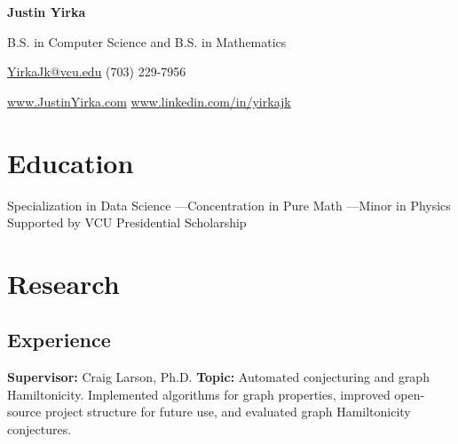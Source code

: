 \documentclass[11pt,letterpaper,serif]{moderncv}
\begin{document}

\thispagestyle{firstpage}

\begin{center}
	{\huge\textbf{Justin Yirka}}
	
	B.S. in Computer Science and B.S. in Mathematics
	
	\href{mailto:yirkajk@vcu.edu}{YirkaJk@vcu.edu} \hspace{2em} (703) 229-7956
	
	\url{www.JustinYirka.com} \qquad \url{www.linkedin.com/in/yirkajk}	
\end{center}


\setlength{\parskip}{0em}
\setlength\bibitemsep{\parskip}


\vspace{-2em}
\section{Education}
\vspace{-1.5em}
{	
	\begin{adjustwidth}{.25in}{}
		Specialization in Data Science \quad---\quad Concentration in Pure Math \quad---\quad Minor in Physics \newline
		Supported by VCU Presidential Scholarship
	\end{adjustwidth}
}


\section{Research}
\subsection{Experience}
{	
	\begin{adjustwidth}{.25in}{}
		\textbf{Supervisor:} Craig Larson, Ph.D. \newline
		\textbf{Topic:} Automated conjecturing and graph Hamiltonicity. Implemented algorithms for graph properties, improved open-source project structure for future use, and evaluated graph Hamiltonicity conjectures.
	\end{adjustwidth}
}
\end{document}
